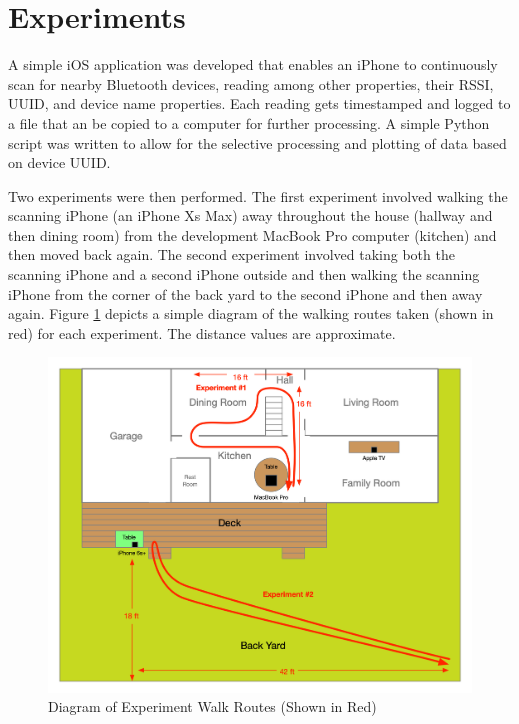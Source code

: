 \documentclass[12pt]{article}
\begin{document}
%
%

\section{Experiments}

A simple iOS application was developed that enables an iPhone to continuously scan for
nearby Bluetooth devices, reading among other properties, their RSSI, UUID, and device
name properties. Each reading gets timestamped and logged to a file that an be copied to
a computer for further processing. A simple Python script was written to allow for the
selective processing and plotting of data based on device UUID.

Two experiments were then performed. The first experiment involved walking the scanning
iPhone (an iPhone Xs Max) away throughout the house (hallway and then dining room) from
the development MacBook Pro computer (kitchen) and then moved back again. The second
experiment involved taking both the scanning iPhone and a second iPhone outside and then
walking the scanning iPhone from the corner of the back yard to the second iPhone and then
away again. Figure \ref{fig:experiment-diagram} depicts a simple diagram of the walking
routes taken (shown in red) for each experiment. The distance values are approximate.

\begin{figure}[ht]
    \centering
    \includegraphics[width=1.0\textwidth]{RSSI-Experiment-Routes.png}
    \caption{Diagram of Experiment Walk Routes (Shown in Red)}
    \label{fig:experiment-diagram}
\end{figure}
\end{document}
